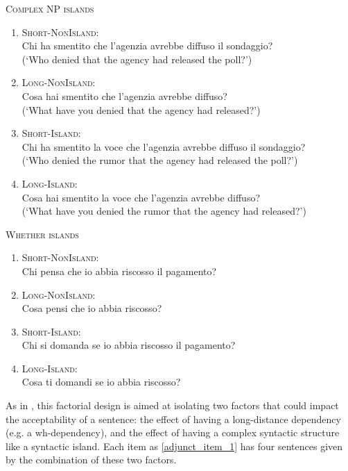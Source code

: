 \begin{example}
	\textsc{Complex NP islands}
	\renewcommand{\labelenumi}{\alph{enumi}.}
	\begin{enumerate}
		\item \textsc{Short-NonIsland:} \\
		Chi ha smentito che l'agenzia avrebbe diffuso il sondaggio? \\
		(`Who denied that the agency had released the poll?')
		\item \textsc{Long-NonIsland:} \\
		Cosa hai smentito che l'agenzia avrebbe diffuso? \\
		(`What have you denied that the agency had released?')
		\item \textsc{Short-Island:} \\
		Chi ha smentito la voce che l'agenzia avrebbe diffuso il sondaggio? \\
		(`Who denied the rumor that the agency had released the poll?')
		\item \textsc{Long-Island:} \\				
		Cosa hai smentito la voce che l'agenzia avrebbe diffuso? \\
		(`What have you denied the rumor that the agency had released?')
	\end{enumerate}
	\label{complex_item_1}
\end{example}

\begin{example}
	\textsc{Whether islands}
	\renewcommand{\labelenumi}{\alph{enumi}.}
	\begin{enumerate}
		\item \textsc{Short-NonIsland:} \\
		Chi pensa che io abbia riscosso il pagamento?
		\item \textsc{Long-NonIsland:} \\
		Cosa pensi che io abbia riscosso?
		\item \textsc{Short-Island:} \\
		Chi si domanda se io abbia riscosso il pagamento?
		\item \textsc{Long-Island:} \\	
		Cosa ti domandi se io abbia riscosso?			
	\end{enumerate}
	\label{whether_item_1}
\end{example}

As in \citet{sprouse2016experimental}, this factorial design is aimed at isolating two factors that could impact the acceptability of a sentence: the effect of having a long-distance dependency (e.g. a wh-dependency), and the effect of having a complex syntactic structure like a syntactic island. Each item as \autoref{adjunct_item_1} has four sentences given by the combination of these two factors. 


